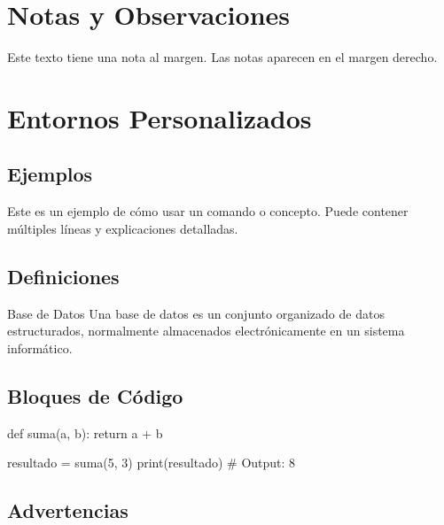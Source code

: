 \documentclass{template_pid}
\begin{document}
\section{Notas y Observaciones}

Este texto tiene una nota al margen. Las notas aparecen en el margen derecho.



\section{Entornos Personalizados}

\subsection{Ejemplos}

\begin{ejemplo}
Este es un ejemplo de cómo usar un comando o concepto.
Puede contener múltiples líneas y explicaciones detalladas.
\end{ejemplo}

\subsection{Definiciones}

\begin{definicion}{Base de Datos}
Una base de datos es un conjunto organizado de datos estructurados,
normalmente almacenados electrónicamente en un sistema informático.
\end{definicion}

\subsection{Bloques de Código}

\begin{codigobloque}
def suma(a, b):
    return a + b

resultado = suma(5, 3)
print(resultado)  # Output: 8
\end{codigobloque}

\subsection{Advertencias}
\end{document}
